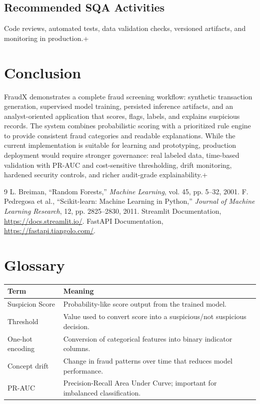 \documentclass[12pt,a4paper]{report}
\begin{document}
\section{Recommended SQA Activities}
Code reviews, automated tests, data validation checks, versioned artifacts, and monitoring in production.\n+
\chapter{Conclusion}
FraudX demonstrates a complete fraud screening workflow: synthetic transaction generation, supervised model training, persisted inference artifacts, and an analyst-oriented application that scores, flags, labels, and explains suspicious records. The system combines probabilistic scoring with a prioritized rule engine to provide consistent fraud categories and readable explanations. While the current implementation is suitable for learning and prototyping, production deployment would require stronger governance: real labeled data, time-based validation with PR-AUC and cost-sensitive thresholding, drift monitoring, hardened security controls, and richer audit-grade explainability.\n+
\begin{thebibliography}{9}
 L. Breiman, ``Random Forests,'' \textit{Machine Learning}, vol. 45, pp. 5--32, 2001.
 F. Pedregosa et al., ``Scikit-learn: Machine Learning in Python,'' \textit{Journal of Machine Learning Research}, 12, pp. 2825--2830, 2011.
 Streamlit Documentation, \url{https://docs.streamlit.io/}.
 FastAPI Documentation, \url{https://fastapi.tiangolo.com/}.
\end{thebibliography}

\chapter*{Glossary}
\begin{longtable}{p{4cm}p{10cm}}
\toprule
\textbf{Term} & \textbf{Meaning} \\\midrule
Suspicion Score & Probability-like score output from the trained model.\\
Threshold & Value used to convert score into a suspicious/not suspicious decision.\\
One-hot encoding & Conversion of categorical features into binary indicator columns.\\
Concept drift & Change in fraud patterns over time that reduces model performance.\\
PR-AUC & Precision-Recall Area Under Curve; important for imbalanced classification.\\
\bottomrule
\end{longtable}
\end{document}
